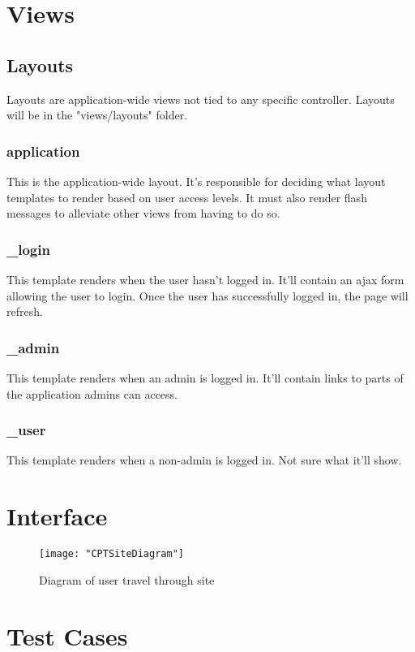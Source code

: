 \documentclass[12pt]{article}
\begin{document}
\section{Views}
\subsection{Layouts}
Layouts are application-wide views not tied to any specific controller. Layouts will be in the "views/layouts" folder.
\subsubsection{application}
This is the application-wide layout. It's responsible for deciding what layout templates to render based on user access levels.
It must also render flash messages to alleviate other views from having to do so.
\subsubsection{\_login}
This template renders when the user hasn't logged in. It'll contain an ajax form allowing the user to login.
Once the user has successfully logged in, the page will refresh.
\subsubsection{\_admin}
This template renders when an admin is logged in. It'll contain links to parts of the application admins can access.
\subsubsection{\_user}
This template renders when a non-admin is logged in. Not sure what it'll show.


\section{Interface}\label{sec:Interface}
\begin{figure}[H]
\begin{center}
\texttt{[image: "CPTSiteDiagram"]}
\caption{Diagram of user  travel through site}
\label{fig:dia}
\end{center}
\end{figure}
\section{Test Cases}
\end{document}

